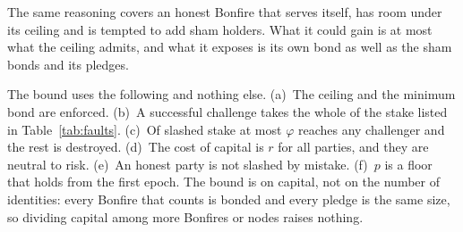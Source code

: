 The same reasoning covers an honest Bonfire that serves itself, has room under its ceiling and is tempted to
add sham holders. What it could gain is at most what the ceiling admits, and what it exposes is its own bond as
well as the sham bonds and its pledges.

The bound uses the following and nothing else. (a)~The ceiling and the minimum bond are enforced. (b)~A successful
challenge takes the whole of the stake listed in Table~\ref{tab:faults}. (c)~Of slashed stake at most $\varphi$
reaches any challenger and the rest is destroyed. (d)~The cost of capital is $r$ for all parties, and they are
neutral to risk. (e)~An honest party is not slashed by mistake. (f)~$p$ is a floor that holds from the first
epoch. The bound is on capital, not on the number of identities: every Bonfire that counts is bonded and every
pledge is the same size, so dividing capital among more Bonfires or nodes raises nothing.

